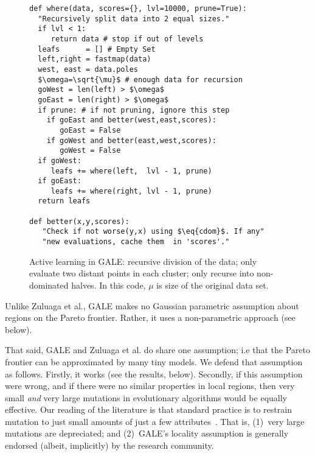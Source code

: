 \documentclass[10pt,journal,compsoc]{IEEEtran}
\newcommand{\eq}[1]{Equation~\ref{eq:#1}}
\newenvironment{changed}{\par\color{MyDarkBlue}}{\par}
\begin{document}
\begin{figure}[!b]
\begin{lstlisting}[mathescape,frame=r,numbers=right]
def where(data, scores={}, lvl=10000, prune=True):  
  "Recursively split data into 2 equal sizes."
  if lvl < 1: 
     return data # stop if out of levels
  leafs      = [] # Empty Set
  left,right = fastmap(data)
  west, east = data.poles
  $\omega=\sqrt{\mu}$ # enough data for recursion
  goWest = len(left) > $\omega$  
  goEast = len(right) > $\omega$ 
  if prune: # if not pruning, ignore this step
    if goEast and better(west,east,scores): 
       goEast = False 
    if goWest and better(east,west,scores): 
       goWest = False 
  if goWest:  
     leafs += where(left,  lvl - 1, prune)  
  if goEast:  
     leafs += where(right, lvl - 1, prune) 
  return leafs

def better(x,y,scores):
   "Check if not worse(y,x) using $\eq{cdom}$. If any"
   "new evaluations, cache them  in 'scores'."
\end{lstlisting}

\caption{Active learning in GALE:
recursive division of the data;
only evaluate two distant points in each cluster;
only recurse into non-dominated halves.
In this code, $\mu$ is size of the original data set.
}
\label{fig:whereCode}   
\end{figure}


\begin{changed}
Unlike Zuluaga et al., GALE makes no Gaussian parametric assumption about regions
on the Pareto frontier.  Rather, it uses a non-parametric approach (see below).

That said, GALE and  Zuluaga et al.  do share one  assumption; i.e that
the Pareto frontier can be approximated by many tiny models.
We defend that assumption as follows. Firstly, it works (see the results, below).
Secondly, 
if this
assumption were wrong, and if there were no similar
properties in local regions, then very small {\em
  and} very large mutations in  evolutionary 
algorithms would be equally effective. Our reading
of the literature is that
standard practice  is to restrain
mutation to just small amounts of just a few attributes~\cite{goldberg00}.
That is, (1)~very large mutations are depreciated; and (2)~GALE's
locality assumption is  generally  endorsed (albeit, implicitly)  by the 
research community.
\end{changed}
\end{document}
